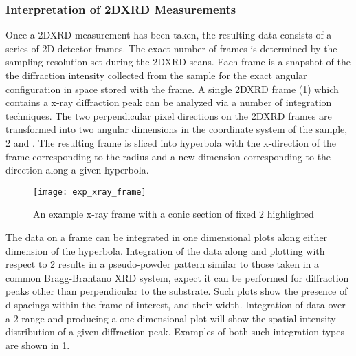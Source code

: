 
\subsubsection{Interpretation of 2DXRD Measurements}
Once a 2DXRD measurement has been taken, the resulting data consists of a series of 2D detector frames. The exact number of frames is determined by the sampling resolution set during the 2DXRD scans. Each frame is a snapshot of the the diffraction intensity collected from the sample for the exact angular configuration in space stored with the frame. A single 2DXRD frame (\cref{fig:exp_xray_frame}) which contains a x-ray diffraction peak can be analyzed via a number of integration techniques. The two perpendicular pixel directions on the 2DXRD frames are transformed into two angular dimensions in the coordinate system of the sample, 2\texttheta{} and \textchi \cite{bobhe}. The resulting frame is sliced into hyperbola with the x-direction of the frame corresponding to the radius and a new dimension \textchi{} corresponding to the direction along a given hyperbola.
\begin{figure}
    \centering
    \texttt{[image: exp\_xray\_frame]}
    \caption[Example 2DXRD frame]{\label{fig:exp_xray_frame}An example x-ray frame with a conic section of fixed 2\texttheta{} highlighted}
\end{figure}

The data on a frame can be integrated in one dimensional plots along either dimension of the hyperbola. Integration of the data along \textchi{} and plotting with respect to 2\texttheta{} results in a pseudo-powder pattern similar to those taken in a common Bragg-Brantano XRD system, expect it can be performed for diffraction peaks other than perpendicular to the substrate. Such plots show the presence of d-spacings within the frame of interest, and their width. Integration of data over a 2\texttheta{} range and producing a one dimensional plot will show the spatial intensity distribution of a given diffraction peak. Examples of both such integration types are shown in \cref{fig:exp_xray_frame}.

